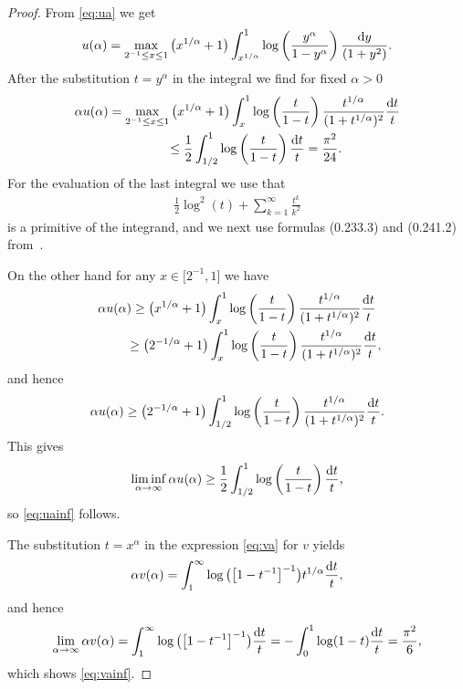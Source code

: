 \documentclass[pdftex]{sigma}
\numberwithin{equation}{section}
\begin{document}
\begin{proof} From \eqref{eq:ua} we get
\begin{gather*}
u(\alpha)=\max_{2^{-1}\le x \le 1}\big(x^{1/\alpha}+1\big)\int_{x^{1/\alpha}}^1\log\left(\frac{y^\alpha}{1-y^\alpha}\right)\frac{{\rm d}y}{(1+y^2)}.
\end{gather*}
After the substitution $t=y^\alpha$ in the integral we find for fixed $\alpha>0$
\begin{gather*}
\alpha u(\alpha) = \max_{2^{-1}\le x \le 1}\big(x^{1/\alpha}+1\big)\int_x^1\log\left(\frac{t}{1-t}\right)
\frac{t^{1/\alpha}}{(1+t^{1/\alpha})^2}\frac{{\rm d}t}{t}\\
\hphantom{\alpha u(\alpha)}{} \le \frac12\int_{1/2}^1\log\left(\frac{t}{1-t}\right)\frac{{\rm d}t}{t}=\frac{\pi^2}{24}.
\end{gather*}
For the evaluation of the last integral we use that
\begin{gather*}
\frac{1}{2}\log^2(t) + \sum_{k=1}^\infty\frac{t^k}{k^2}
\end{gather*}
is a primitive of the integrand, and we next use formulas (0.233.3) and (0.241.2) from~\cite{Gr:Ry}.

On the other hand for any $x\in \big[2^{-1},1\big]$ we have
\begin{gather*}
\alpha u(\alpha) \ge \big(x^{1/\alpha}+1\big)\int_x^1\log\left(\frac{t}{1-t}\right)
\frac{t^{1/\alpha}}{(1+t^{1/\alpha})^2}\frac{{\rm d}t}{t}\\
 \hphantom{\alpha u(\alpha)}{} \ge \big(2^{-1/\alpha}+1\big)\int_{x}^1\log\left(\frac{t}{1-t}\right)
\frac{t^{1/\alpha}}{(1+t^{1/\alpha})^2}\frac{{\rm d}t}{t},
\end{gather*}
and hence
\begin{gather*}
\alpha u(\alpha)\ge \big(2^{-1/\alpha}+1\big)\int_{1/2}^1\log\left(\frac{t}{1-t}\right)
\frac{t^{1/\alpha}}{(1+t^{1/\alpha})^2}\frac{{\rm d}t}{t}.
\end{gather*}
This gives
\begin{gather*}
\liminf_{\alpha\to\infty} \alpha u(\alpha)\ge \frac12\int_{1/2}^1\log\left(\frac{t}{1-t}\right)\frac{{\rm d}t}{t},
\end{gather*}
so \eqref{eq:uainf} follows.

The substitution $t=x^\alpha$ in the expression \eqref{eq:va} for $v$ yields
\begin{gather*}
\alpha v(\alpha)=\int_1^\infty \log\big(\big[1-t^{-1}\big]^{-1}\big) t^{1/\alpha}\frac{{\rm d}t}{t},
\end{gather*}
and hence
\begin{gather*}
\lim_{\alpha\to\infty} \alpha v(\alpha)=\int_1^\infty\log\big(\big[1-t^{-1}\big]^{-1}\big)\frac{{\rm d}t}{t}=
-\int_0^1 \log(1-t)\frac{{\rm d}t}{t}=\frac{\pi^2}{6},
\end{gather*}
which shows \eqref{eq:vainf}.
\end{proof}
\end{document}
